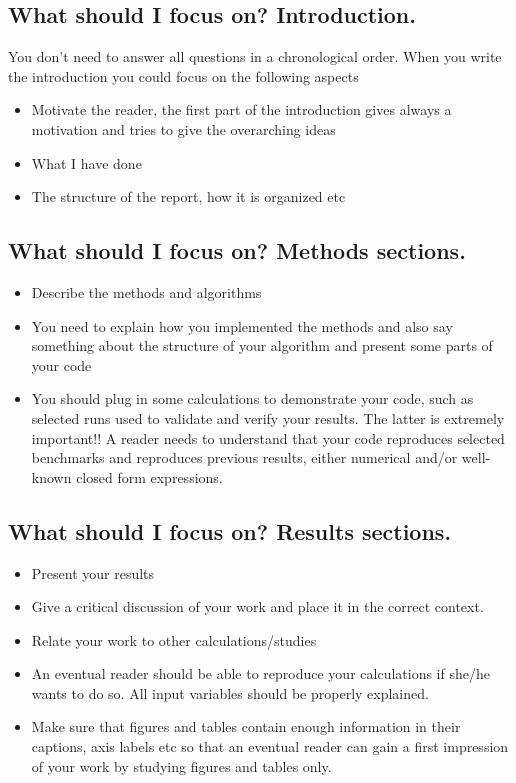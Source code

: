 \documentclass[10pt]{article}
\begin{document}
\subsection*{What should I focus on? Introduction.}
You don't need to answer all questions in a chronological order. When you write the introduction you could focus on the following aspects
\begin{itemize}
\item Motivate the reader, the first part of the introduction gives always a motivation and tries to give the overarching ideas
\item What I have done
\item The structure of the report, how it is organized etc
\end{itemize}
\subsection*{What should I focus on? Methods sections.}
\begin{itemize}
\item Describe the methods and algorithms
\item You need to explain how you implemented the methods and also say something about the structure of your algorithm and present some parts of your code
\item You should plug in some calculations to demonstrate your code, such as selected runs used to validate and verify your results. The latter is extremely important!! A reader needs to understand that your code reproduces selected benchmarks and reproduces previous results, either numerical and/or well-known closed form expressions.
\end{itemize}

\subsection*{What should I focus on? Results sections.}
\begin{itemize}
\item Present your results
\item Give a critical discussion of your work and place it in the correct context.
\item Relate your work to other calculations/studies
\item An eventual reader should be able to reproduce your calculations if she/he wants to do so. All input variables should be properly explained.
\item Make sure that figures and tables contain enough information in their captions, axis labels etc so that an eventual reader can gain a first impression of your work by studying figures and tables only.
\end{itemize}
\end{document}
